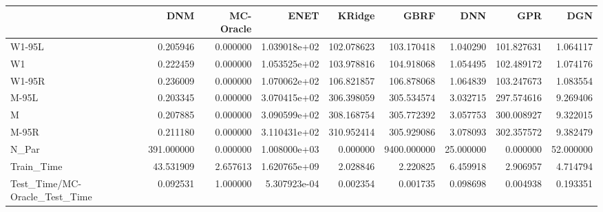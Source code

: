 \begin{tabular}{lrrrrrrrr}
\toprule
{} &         DNM &  MC-Oracle &          ENET &      KRidge &         GBRF &        DNN &         GPR &        DGN \\
\midrule
W1-95L                        &    0.205946 &   0.000000 &  1.039018e+02 &  102.078623 &   103.170418 &   1.040290 &  101.827631 &   1.064117 \\
W1                            &    0.222459 &   0.000000 &  1.053525e+02 &  103.978816 &   104.918068 &   1.054495 &  102.489172 &   1.074176 \\
W1-95R                        &    0.236009 &   0.000000 &  1.070062e+02 &  106.821857 &   106.878068 &   1.064839 &  103.247673 &   1.083554 \\
M-95L                         &    0.203345 &   0.000000 &  3.070415e+02 &  306.398059 &   305.534574 &   3.032715 &  297.574616 &   9.269406 \\
M                             &    0.207885 &   0.000000 &  3.090599e+02 &  308.168754 &   305.772392 &   3.057753 &  300.008927 &   9.322015 \\
M-95R                         &    0.211180 &   0.000000 &  3.110431e+02 &  310.952414 &   305.929086 &   3.078093 &  302.357572 &   9.382479 \\
N\_Par                         &  391.000000 &   0.000000 &  1.008000e+03 &    0.000000 &  9400.000000 &  25.000000 &    0.000000 &  52.000000 \\
Train\_Time                    &   43.531909 &   2.657613 &  1.620765e+09 &    2.028846 &     2.220825 &   6.459918 &    2.906957 &   4.714794 \\
Test\_Time/MC-Oracle\_Test\_Time &    0.092531 &   1.000000 &  5.307923e-04 &    0.002354 &     0.001735 &   0.098698 &    0.004938 &   0.193351 \\
\bottomrule
\end{tabular}
